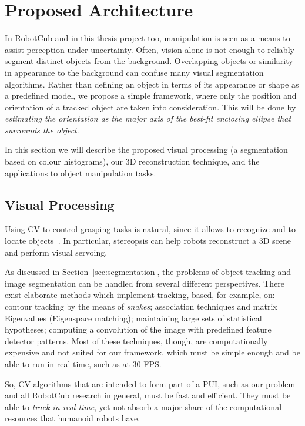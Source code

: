 
\chapter{Proposed Architecture}
\label{chap:proposed_architecture}

In \ac{RobotCub} and in this thesis project too, manipulation is seen as a means to assist perception under uncertainty. Often, vision alone is not enough to reliably segment distinct objects from the background. Overlapping objects or similarity in appearance to the background can confuse many visual segmentation algorithms. Rather than defining an object in terms of its appearance or shape as a predefined model, we propose a simple framework, where only the position and orientation of a tracked object are taken into consideration. This will be done by \emph{estimating the orientation as the major axis of the best-fit enclosing ellipse that surrounds the object}.

In this section we will describe the proposed visual processing (a segmentation based on colour histograms), our 3D reconstruction technique, and the applications to object manipulation tasks.

\section{Visual Processing}

Using \ac{CV} to control grasping tasks is natural, since it allows to recognize and to locate objects~\cite{dufournaud:1998}. In particular, stereopsis can help robots reconstruct a 3D scene and perform visual servoing.

As discussed in Section~\ref{sec:segmentation}, the problems of object tracking and image segmentation can be handled from several different perspectives. There exist elaborate methods which implement tracking, based, for example, on: contour tracking by the means of \emph{snakes}; association techniques and matrix Eigenvalues (Eigenspace matching); maintaining large sets of statistical hypotheses; computing a convolution of the image with predefined feature detector patterns. Most of these techniques, though, are computationally expensive and not suited for our framework, which must be simple enough and be able to run in real time, such as at 30 \ac{FPS}.

So, \ac{CV} algorithms that are intended to form part of a \ac{PUI}, such as our problem and all \ac{RobotCub} research in general, must be fast and efficient. They must be able to \emph{track in real time}, yet not absorb a major share of the computational resources that humanoid robots have.

